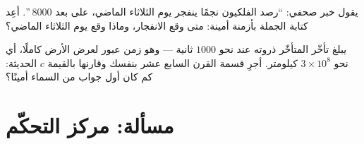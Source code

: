 \begin{exercise}[$\star\star$]\label{exo:g8:speed-of-light:11}
يقول خبر صحفي: ``رصد الفلكيون نجمًا ينفجر يوم الثلاثاء
الماضي، على بعد $8000$ ''. أعِد كتابة الجملة بأزمنة
أمينة: متى وقع الانفجار، وماذا وقع يوم الثلاثاء الماضي؟
\end{exercise}

\begin{exercise}[$\star\star\star$]\label{exo:g8:speed-of-light:12}
يبلغ تأخّر  المتأخّر ذروته عند نحو $1000$ ثانية --- وهو
زمن عبور  لعرض  الأرض كاملًا، أي نحو
$3 \times 10^{8}$ كيلومتر. أجرِ قسمة القرن السابع عشر بنفسك
وقارنها بالقيمة $c$ الحديثة: كم كان أول جواب من السماء أمينًا؟
\end{exercise}

\section{مسألة: مركز التحكّم}

